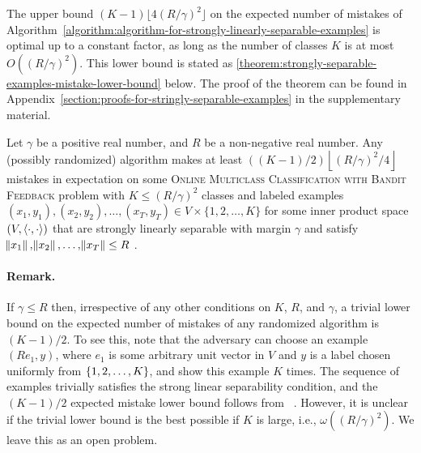 The upper bound $(K-1) \lfloor 4(R/\gamma)^2 \rfloor$ on the expected number of
mistakes of
Algorithm~\ref{algorithm:algorithm-for-strongly-linearly-separable-examples} is
optimal up to a constant factor, as long as the number of classes $K$ is at most
$O((R/\gamma)^2)$. This lower bound is stated as
\autoref{theorem:strongly-separable-examples-mistake-lower-bound} below. The
proof of the theorem can be found in
Appendix~\ref{section:proofs-for-stringly-separable-examples} in the
supplementary material.

\begin{theorem}
\label{theorem:strongly-separable-examples-mistake-lower-bound}
Let $\gamma$ be a positive real number, and $R$ be a non-negative real
number. 
Any (possibly randomized) algorithm makes at least 
$((K-1)/2)\left\lfloor (R/\gamma)^2/4 \right\rfloor$ mistakes in expectation 
on some \textsc{Online
Multiclass Classification with Bandit Feedback} problem with $K \le
(R/\gamma)^2$ classes and labeled
examples $(x_1, y_1), (x_2, y_2), \dots, (x_T, y_T) \in V \times
\{1,2,\dots,K\}$ for some inner product space $(V,
\left\langle \cdot, \cdot \right\rangle)$ that are strongly linearly separable with margin $\gamma$ and satisfy $\norm{x_1}, \norm{x_2}, \dots, \norm{x_T} \le R$ .
%
\end{theorem}

\paragraph{Remark.} 
If $\gamma \le R$ then, irrespective 
of any other conditions on $K$, $R$, and $\gamma$, 
a trivial lower bound on the expected number of mistakes of any randomized
algorithm is $(K-1)/2$. To see this, note that the adversary can choose an
example $(R e_1, y)$, where $e_1$ is some arbitrary unit vector in $V$ and $y$ is a label chosen uniformly from
$\cbr{1,2,\dots,K}$, and show this example $K$ times. The sequence of examples
trivially satisfies the strong linear separability condition, and the
$(K-1)/2$ expected mistake lower bound follows from ~\citep[][Claim 2]{Daniely-Helbertal-2013}. However, it is unclear if the trivial lower
bound is the best possible if $K$ is large, i.e., $\omega((R/\gamma)^2)$. We
leave this as an open problem.

